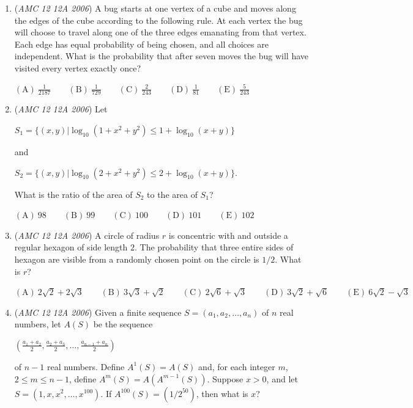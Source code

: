 \begin{enumerate}
$\mathrm{(A) \ } \frac{908}{119}\qquad \mathrm{(B) \ } \frac{909}{119}\qquad \mathrm{(C) \ } \frac{130}{17}\qquad \mathrm{(D) \ } \frac{911}{119}\qquad \mathrm{(E) \ }  \frac{912}{119}$


	\item (\textit{AMC 12 12A 2006}) A bug starts at one vertex of a cube and moves along the edges of the cube according to the following rule. At each vertex the bug will choose to travel along one of the three edges emanating from that vertex. Each edge has equal probability of being chosen, and all choices are independent. What is the probability that after seven moves the bug will have visited every vertex exactly once?


 $\mathrm{(A) \ } \frac{1}{2187}\qquad \mathrm{(B) \ } \frac{1}{729}\qquad \mathrm{(C) \ } \frac{2}{243}\qquad \mathrm{(D) \ } \frac{1}{81}\qquad \mathrm{(E) \ }  \frac{5}{243}$


	\item (\textit{AMC 12 12A 2006}) Let 


 $S_1=\{(x,y)|\log_{10}(1+x^2+y^2)\le 1+\log_{10}(x+y)\}$


 and 


 $S_2=\{(x,y)|\log_{10}(2+x^2+y^2)\le 2+\log_{10}(x+y)\}$.


 What is the ratio of the area of $S_2$ to the area of $S_1$?


 $\mathrm{(A) \ } 98\qquad \mathrm{(B) \ } 99\qquad \mathrm{(C) \ } 100\qquad \mathrm{(D) \ } 101\qquad \mathrm{(E) \ }  102$


	\item (\textit{AMC 12 12A 2006}) A circle of radius $r$ is concentric with and outside a regular hexagon of side length $2$. The probability that three entire sides of hexagon are visible from a randomly chosen point on the circle is $1/2$. What is $r$?


 $\mathrm{(A) \ } 2\sqrt{2}+2\sqrt{3}\qquad \mathrm{(B) \ } 3\sqrt{3}+\sqrt{2}\qquad \mathrm{(C) \ } 2\sqrt{6}+\sqrt{3} \qquad \mathrm{(D) \ } 3\sqrt{2}+\sqrt{6}\qquad \mathrm{(E) \ }  6\sqrt{2}-\sqrt{3}$


	\item (\textit{AMC 12 12A 2006}) Given a finite sequence $S=(a_1,a_2,\ldots ,a_n)$ of $n$ real numbers, let $A(S)$ be the sequence 


 $\left(\frac{a_1+a_2}{2},\frac{a_2+a_3}{2},\ldots ,\frac{a_{n-1}+a_n}{2}\right)$


 of $n-1$ real numbers. Define $A^1(S)=A(S)$ and, for each integer $m$, $2\le m\le n-1$, define $A^m(S)=A(A^{m-1}(S))$. Suppose $x>0$, and let $S=(1,x,x^2,\ldots ,x^{100})$. If $A^{100}(S)=(1/2^{50})$, then what is $x$?



\end{enumerate}
